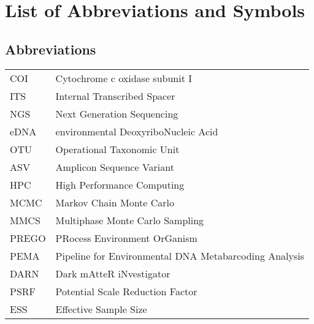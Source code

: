 \documentclass[master=elt, cleveref, autoref, masteroption=eg]{kulemt}
\begin{document}
\listoffiguresandtables

\chapter{List of Abbreviations and Symbols}

\section*{Abbreviations}
   \begin{flushleft}
   \renewcommand{\arraystretch}{1.1}
   \begin{tabularx}{\textwidth}{@{}p{12mm}X@{}}
      COI   & Cytochrome c oxidase subunit I\\
      ITS   & Internal Transcribed Spacer\\
      NGS   & Next Generation Sequencing\\
      eDNA  & environmental DeoxyriboNucleic Acid\\
      OTU   & Operational Taxonomic Unit\\
      ASV   & Amplicon Sequence Variant\\
      HPC   & High Performance Computing\\
      MCMC  & Markov Chain Monte Carlo\\
      MMCS  & Multiphase Monte Carlo Sampling\\
      PREGO & PRocess Environment OrGanism\\
      PEMA  & Pipeline for Environmental DNA Metabarcoding Analysis\\
      DARN  & Dark mAtteR iNvestigator\\
      PSRF  & Potential Scale Reduction Factor\\
      ESS   & Effective Sample Size\\
   \end{tabularx}
\end{flushleft}


\end{document}
